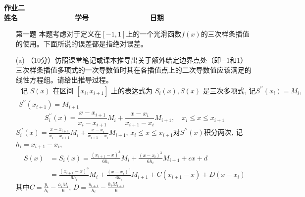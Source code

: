 \documentclass[12pt,a4paper,utf8]{ctexart}
\begin{document}
	
	\begin{center}
		\textbf{作业二}\\
		\textbf{姓名 ~~~~~~~~~~~~~ 学号 ~~~~~~~~~~~~~~ 日期}\\
	\end{center}
	
	\begin{center}
		\fbox{
			\begin{minipage}{40em}
				\vspace{5cm}
				\hspace{20cm}
		\end{minipage}}
	\end{center}
	\vspace{1cm}
	
	\begin{enumerate}
		\item[第一题] 本题考虑对于定义在$[−1, 1]$上的一个光滑函数$f(x)$的三次样条插值的使用。下面所说的误差都是指绝对误差。  
		\item[(a)]（10分）仿照课堂笔记或课本推导出关于额外给定边界点处（即$−1$和$1$）三次样条插值多项式的一次导数值时其在各插值点上的二次导数值应该满足的线性方程组。请给出推导过程。\\
		$$
		\begin{array}{l}
			\text { 记 } S(x) \text { 在区间 }\left[x_{i}, x_{i+1}\right] \text { 上的表达式为 } S_{i}(x), S(x) \text { 是三次多项式, }\text {记} S^{\prime \prime}\left(x_{i}\right)=M_{i},\\
			S^{\prime \prime}\left(x_{i+1}\right)=M_{i+1}
		\end{array}$$
		$$
		S_{i}^{\prime \prime}(x)=\frac{x-x_{i+1}}{x_{i}-x_{i+1}} 
		M_{i}+\frac{x-x_{i}}{x_{i+1}-x_{i}} 
		M_{i+1}, \quad x_{i} \leqslant x \leqslant x_{i+1}
		$$
		$S_{i}^{\prime \prime}(x)=\frac{x-x_{i+1}}{x_{i}-x_{i+1}} M_{i}+\frac{x-x_{i}}{x_{i+1}-x_{i}} M_{i+1}$, \quad $x_{i} \leqslant x \leqslant x_{i+1}对S^{\prime \prime}(x)$积分两次, 记$h_{i}=x_{i+1}-x_{i}$,
		$$
		\begin{aligned}
			S(x) &=S_{i}(x)=\frac{\left(x_{i+1}-x\right)^{3}}{6 h_{i}} M_{i}+\frac{\left(x-x_{i}\right)^{3}}{6 h_{i}} M_{i+1}+c x+d \\
			&=\frac{\left(x_{i+1}-x\right)^{3}}{6 h_{i}} M_{i}+\frac{\left(x-x_{i}\right)^{3}}{6 h_{i}} M_{i+1}+C\left(x_{i+1}-x\right)+D\left(x-x_{i}\right)
		\end{aligned}
		$$
		其中$C=\frac{y_{i}}{h_{i}}-\frac{h_{i} M_{i}}{6}$, \quad $D=\frac{y_{i+1}}{h_{i}}-\frac{h_{i} M_{i+1}}{6}$\\

\end{enumerate}
\end{document}
